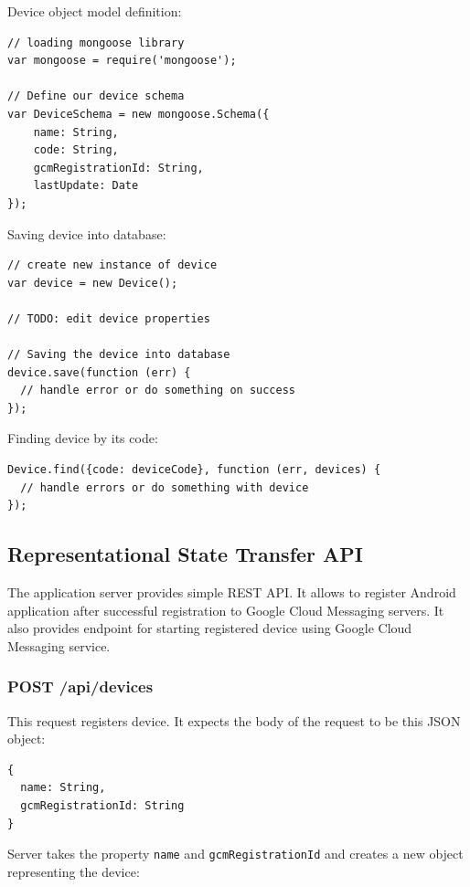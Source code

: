 \noindent
Device object model definition:\vspace{-0.5em}
\begin{lstlisting}
// loading mongoose library
var mongoose = require('mongoose'); 

// Define our device schema
var DeviceSchema = new mongoose.Schema({
    name: String,
    code: String,
    gcmRegistrationId: String,
    lastUpdate: Date
});
\end{lstlisting}

\noindent
Saving device into database:\vspace{-0.5em}
\begin{lstlisting}
// create new instance of device
var device = new Device();

// TODO: edit device properties

// Saving the device into database
device.save(function (err) {
  // handle error or do something on success
});
\end{lstlisting}

\noindent
Finding device by its code:\vspace{-0.5em}
\begin{lstlisting}
Device.find({code: deviceCode}, function (err, devices) {
  // handle errors or do something with device
});
\end{lstlisting}



\subsection{Representational State Transfer API}
The application server provides simple REST API. It allows to register Android application after successful registration to Google Cloud Messaging servers. It also provides endpoint for starting registered device using Google Cloud Messaging service.

\subsubsection{POST /api/devices}
This request registers device. It expects the body of the request to be this JSON object:

\begin{lstlisting}
{
  name: String,
  gcmRegistrationId: String 
}
\end{lstlisting}

\noindent
Server takes the property \verb!name! and \verb!gcmRegistrationId! and creates a new object representing the device:

